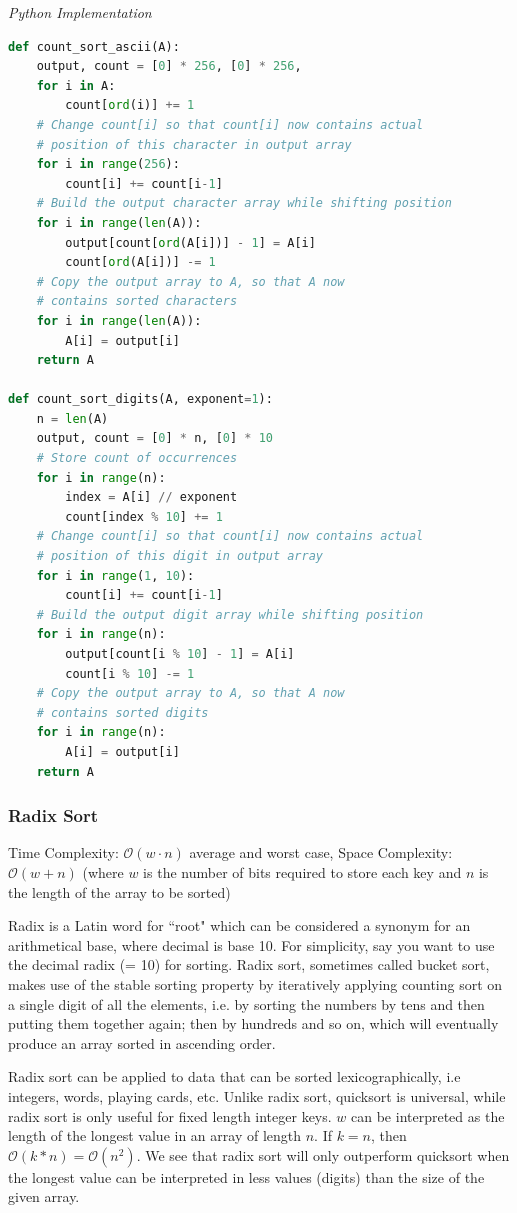 \documentclass{article}
\newcommand{\bigO}{\mathcal{O}}
\begin{document}
\vspace{8pt} \emph{Python Implementation}
\begin{lstlisting}[language=Python]
def count_sort_ascii(A):
    output, count = [0] * 256, [0] * 256, 
    for i in A:
        count[ord(i)] += 1
    # Change count[i] so that count[i] now contains actual
    # position of this character in output array
    for i in range(256):
        count[i] += count[i-1]
    # Build the output character array while shifting position
    for i in range(len(A)):
        output[count[ord(A[i])] - 1] = A[i]
        count[ord(A[i])] -= 1
    # Copy the output array to A, so that A now
    # contains sorted characters
    for i in range(len(A)):
        A[i] = output[i]
    return A
    
def count_sort_digits(A, exponent=1):
    n = len(A)
    output, count = [0] * n, [0] * 10
    # Store count of occurrences
    for i in range(n): 
        index = A[i] // exponent
        count[index % 10] += 1
    # Change count[i] so that count[i] now contains actual
    # position of this digit in output array
    for i in range(1, 10): 
        count[i] += count[i-1] 
    # Build the output digit array while shifting position
    for i in range(n):
        output[count[i % 10] - 1] = A[i]
        count[i % 10] -= 1
    # Copy the output array to A, so that A now
    # contains sorted digits
    for i in range(n):
        A[i] = output[i]
    return A
\end{lstlisting}

    \subsubsection{Radix Sort}
    Time Complexity: $\bigO(w \cdot n)$ average and worst case, Space Complexity: $\bigO(w + n)$ (where $w$ is the number of bits required to store each key and $n$ is the length of the array to be sorted)
    
    Radix is a Latin word for ``root" which can be considered a synonym for an arithmetical base, where decimal is base 10. For simplicity, say you want to use the decimal radix (= 10) for sorting. Radix sort, sometimes called bucket sort, makes use of the stable sorting property by iteratively applying counting sort on a single digit of all the elements, i.e. by sorting the numbers by tens and then putting them together again; then by hundreds and so on,  which will eventually produce an array sorted in ascending order. 
    
    Radix sort can be applied to data that can be sorted lexicographically, i.e integers, words, playing cards, etc. Unlike radix sort, quicksort is universal, while radix sort is only useful for fixed length integer keys. $w$ can be interpreted as the length of the longest value in an array of length $n$. If $k = n$, then  $\bigO(k * n) = \bigO(n^2)$. We see that radix sort will only outperform quicksort when the longest value can be interpreted in less values (digits) than the size of the given array.
    
\end{document}
